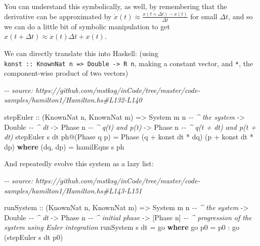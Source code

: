 \documentclass[]{article}
\newenvironment{Shaded}{}{}
\newcommand{\CommentTok}[1]{\textcolor[rgb]{0.38,0.63,0.69}{\textit{#1}}}
\newcommand{\DataTypeTok}[1]{\textcolor[rgb]{0.56,0.13,0.00}{#1}}
\newcommand{\KeywordTok}[1]{\textcolor[rgb]{0.00,0.44,0.13}{\textbf{#1}}}
\newcommand{\NormalTok}[1]{#1}
\newcommand{\OperatorTok}[1]{\textcolor[rgb]{0.40,0.40,0.40}{#1}}
\newcommand{\OtherTok}[1]{\textcolor[rgb]{0.00,0.44,0.13}{#1}}
\begin{document}
You can understand this symbolically, as well, by remembering that the
derivative can be approximated by \(\dot{x}(t) \approx \frac{x(t + \Delta t) -
x(t)}{\Delta t}\) for small \(\Delta t\), and so we can do a little bit of
symbolic manipulation to get \(x(t + \Delta t) \approx \dot{x}(t) \Delta t +
x(t)\).

We can directly translate this into Haskell: (using
\texttt{konst\ ::\ KnownNat\ n\ =\textgreater{}\ Double\ -\textgreater{}\ R\ n},
making a constant vector, and \texttt{*}, the component-wise product of two
vectors)

\begin{Shaded}
\begin{Highlighting}[]
\CommentTok{{-}{-} source: https://github.com/mstksg/inCode/tree/master/code{-}samples/hamilton1/Hamilton.hs\#L132{-}L140}

\NormalTok{stepEuler}
\OtherTok{    ::}\NormalTok{ (}\DataTypeTok{KnownNat}\NormalTok{ n, }\DataTypeTok{KnownNat}\NormalTok{ m)}
    \OtherTok{=\textgreater{}} \DataTypeTok{System}\NormalTok{ m n       }\CommentTok{{-}{-} \^{} the system}
    \OtherTok{{-}\textgreater{}} \DataTypeTok{Double}           \CommentTok{{-}{-} \^{} dt}
    \OtherTok{{-}\textgreater{}} \DataTypeTok{Phase}\NormalTok{ n          }\CommentTok{{-}{-} \^{} q(t) and p(t)}
    \OtherTok{{-}\textgreater{}} \DataTypeTok{Phase}\NormalTok{ n          }\CommentTok{{-}{-} \^{} q(t + dt) and p(t + dt)}
\NormalTok{stepEuler s dt ph}\OperatorTok{@}\NormalTok{(}\DataTypeTok{Phase}\NormalTok{ q p) }\OtherTok{=} \DataTypeTok{Phase}\NormalTok{ (q }\OperatorTok{+}\NormalTok{ konst dt }\OperatorTok{*}\NormalTok{ dq) (p }\OperatorTok{+}\NormalTok{ konst dt }\OperatorTok{*}\NormalTok{ dp)}
  \KeywordTok{where}
\NormalTok{    (dq, dp) }\OtherTok{=}\NormalTok{ hamilEqns s ph}
\end{Highlighting}
\end{Shaded}

And repeatedly evolve this system as a lazy list:

\begin{Shaded}
\begin{Highlighting}[]
\CommentTok{{-}{-} source: https://github.com/mstksg/inCode/tree/master/code{-}samples/hamilton1/Hamilton.hs\#L143{-}L151}

\NormalTok{runSystem}
\OtherTok{    ::}\NormalTok{ (}\DataTypeTok{KnownNat}\NormalTok{ n, }\DataTypeTok{KnownNat}\NormalTok{ m)}
    \OtherTok{=\textgreater{}} \DataTypeTok{System}\NormalTok{ m n       }\CommentTok{{-}{-} \^{} the system}
    \OtherTok{{-}\textgreater{}} \DataTypeTok{Double}           \CommentTok{{-}{-} \^{} dt}
    \OtherTok{{-}\textgreater{}} \DataTypeTok{Phase}\NormalTok{ n          }\CommentTok{{-}{-} \^{} initial phase}
    \OtherTok{{-}\textgreater{}}\NormalTok{ [}\DataTypeTok{Phase}\NormalTok{ n]        }\CommentTok{{-}{-} \^{} progression of the system using Euler integration}
\NormalTok{runSystem s dt }\OtherTok{=}\NormalTok{ go}
  \KeywordTok{where}
\NormalTok{    go p0 }\OtherTok{=}\NormalTok{ p0 }\OperatorTok{:}\NormalTok{ go (stepEuler s dt p0)}
\end{Highlighting}
\end{Shaded}
\end{document}
